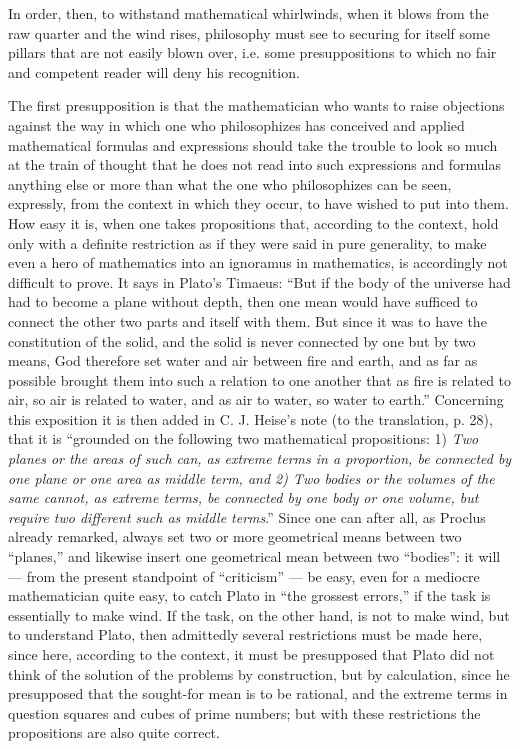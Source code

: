 \documentclass[12pt,a4paper,openany]{book}
\newcommand{\opage}[1]{\marginnote{\footnotesize\textit{[#1]}}}
\begin{document}
In order, then, to withstand mathematical whirlwinds, when
it blows from the raw quarter and the wind rises, philosophy
must see to securing for itself some pillars that are not easily
blown over, i.e. some presuppositions to which no fair
and competent reader will deny his recognition.

The first presupposition is that the mathematician who
wants to raise objections against the way in which one who philosophizes
has conceived and applied mathematical formulas and
expressions should take the trouble to look so much at the train of thought
that he does not read into such expressions and formulas anything else or
more than what the one who philosophizes can be seen, expressly, from the context
in which they occur, to have wished to put into them.
How easy it is, when one takes propositions that, according to
the context, hold only with a definite restriction
as if they were said in pure generality, to make even
a hero of mathematics into an ignoramus in mathematics, is
accordingly not difficult to prove. It says in Plato's
Timaeus: ``But if the body of the universe had
had to become a plane without depth, then one mean would have
sufficed to connect the other two parts and itself
with them. But since it was to have the constitution of the solid,
and the solid is never connected by one but by two means,
God therefore set water and air between fire and earth, and
as far as possible brought them into such a relation to one another
that as fire is related to air, so
air is related to water, and as air to water, so
water to earth.'' Concerning this exposition it is then added in
C. J. Heise's note (to the translation, p. 28), that it
\opage{V}is ``grounded on the following two mathematical propositions: 1) \emph{Two
planes or the areas of such can, as extreme terms
in a proportion, be connected by one plane or
one area as middle term, and 2) Two bodies or the
volumes of the same cannot, as extreme terms, be connected
by one body or one volume, but
require two different such as middle terms}.''
Since one can after all, as Proclus already remarked, always
set two or more geometrical means between two ``planes,'' and likewise insert
one geometrical mean between two ``bodies'': it will --- from the
present standpoint of ``criticism'' --- be easy, even for a mediocre
mathematician quite easy, to catch Plato in ``the
grossest errors,'' if the task is essentially to make wind.
If the task, on the other hand, is not to make wind, but to understand
Plato, then admittedly several restrictions must be made here,
since here, according to the context, it must be presupposed that Plato
did not think of the solution of the problems by construction,
but by calculation, since he presupposed that the sought-for
mean is to be rational, and the extreme terms in question
squares and cubes of prime numbers; but with these restrictions
the propositions are also quite correct.
\end{document}

